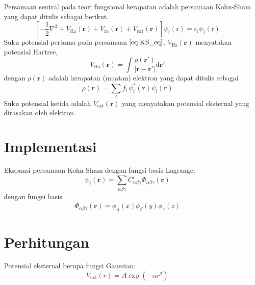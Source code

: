 \documentclass[11pt]{article}
\begin{document}
Persamaan sentral pada teori fungsional kerapatan adalah persamaan
Kohn-Sham yang dapat ditulis sebagai berikut.
\begin{equation}
\left[
-\frac{1}{2}\nabla^2
+ V_{\mathrm{Ha}}(\mathbf{r})
+ V_{\mathrm{xc}}(\mathbf{r})
+ V_{\mathrm{ext}}(\mathbf{r})
\right]\psi_{i}(\mathrm{r}) =
\epsilon_{i} \psi_{i}(\mathrm{r})
\label{eq:KS_eq}
\end{equation}
Suku potensial pertama pada persamaan $\eqref{eq:KS_eq}$,
$V_{\mathrm{Ha}}(\mathbf{r})$ menyatakan potensial Hartree,
\begin{equation}
V_{\mathrm{Ha}}(\mathbf{r}) =
\int
\frac{\rho(\mathbf{r}')}{\left|\mathbf{r} - \mathbf{r}'\right|}
\mathrm{d}\mathbf{r}'
\end{equation}
dengan $\rho(\mathbf{r})$ adalah kerapatan (muatan) elektron
yang dapat ditulis sebagai
\begin{equation}
\rho(\mathbf{r}) = \sum_{i} f_{i}\, \psi^{*}_{i}(\mathbf{r}) \psi_{i}(\mathbf{r})
\end{equation}
Suku potensial ketida adalah $V_{\mathrm{ext}}(\mathbf{r})$
yang menyatakan potensial eksternal yang dirasakan oleh elektron.



\section{Implementasi}

Ekspansi persamaan Kohn-Sham dengan fungsi basis Lagrange:
\begin{equation}
\psi_{i}(\mathbf{r}) = \sum_{\alpha\beta\gamma}
C^{i}_{\alpha\beta\gamma} \Phi_{\alpha\beta\gamma}(\mathbf{r})
\end{equation}
dengan fungsi basis
\begin{eqnarray}
\Phi_{\alpha\beta\gamma}(\mathbf{r}) =
\phi_{\alpha}(x)\phi_{\beta}(y)\phi_{\gamma}(z)
\end{eqnarray}


\section{Perhitungan}

Potensial eksternal berupa fungsi Gaussian:
\begin{equation}
V_{\mathrm{ext}}(r) = A\exp(-\alpha r^2)
\end{equation}
\end{document}
